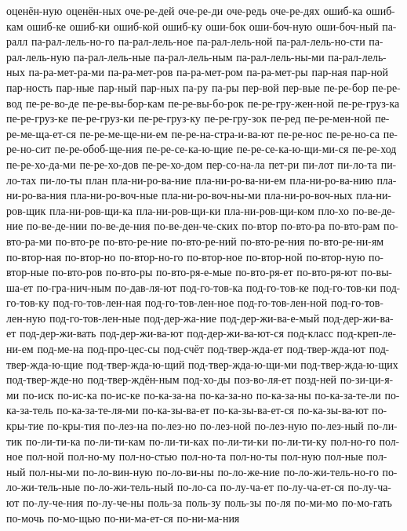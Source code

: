 {оценён-ную
оценён-ных
оче-ре-дей
оче-ре-ди
оче-редь
оче-ре-дях
ошиб-ка
ошиб-кам
ошиб-ке
ошиб-ки
ошиб-кой
ошиб-ку
оши-бок
оши-боч-ную
оши-боч-ный
па-ралл
па-рал-лель-но-го
па-рал-лель-ное
па-рал-лель-ной
па-рал-лель-но-сти
па-рал-лель-ную
па-рал-лель-ные
па-рал-лель-ным
па-рал-лель-ны-ми
па-рал-лель-ных
па-ра-мет-ра-ми
па-ра-мет-ров
па-ра-мет-ром
па-ра-мет-ры
пар-ная
пар-ной
пар-ность
пар-ные
пар-ный
пар-ных
па-ру
па-ры
пер-вой
пер-вые
пе-ре-бор
пе-ре-вод
пе-ре-во-де
пе-ре-вы-бор-кам
пе-ре-вы-бо-рок
пе-ре-гру-жен-ной
пе-ре-груз-ка
пе-ре-груз-ке
пе-ре-груз-ки
пе-ре-груз-ку
пе-ре-гру-зок
пе-ред
пе-ре-мен-ной
пе-ре-ме-ща-ет-ся
пе-ре-ме-ще-ни-ем
пе-ре-на-стра-и-ва-ют
пе-ре-нос
пе-ре-но-са
пе-ре-но-сит
пе-ре-обоб-ще-ния
пе-ре-се-ка-ю-щие
пе-ре-се-ка-ю-щи-ми-ся
пе-ре-ход
пе-ре-хо-да-ми
пе-ре-хо-дов
пе-ре-хо-дом
пер-со-на-ла
пет-ри
пи-лот
пи-ло-та
пи-ло-тах
пи-ло-ты
план
пла-ни-ро-ва-ние
пла-ни-ро-ва-ни-ем
пла-ни-ро-ва-нию
пла-ни-ро-ва-ния
пла-ни-ро-воч-ные
пла-ни-ро-воч-ны-ми
пла-ни-ро-воч-ных
пла-ни-ров-щик
пла-ни-ров-щи-ка
пла-ни-ров-щи-ки
пла-ни-ров-щи-ком
пло-хо
по-ве-де-ние
по-ве-де-нии
по-ве-де-ния
по-ве-ден-че-ских
по-втор
по-вто-ра
по-вто-рам
по-вто-ра-ми
по-вто-ре
по-вто-ре-ние
по-вто-ре-ний
по-вто-ре-ния
по-вто-ре-ни-ям
по-втор-ная
по-втор-но
по-втор-но-го
по-втор-ное
по-втор-ной
по-втор-ную
по-втор-ные
по-вто-ров
по-вто-ры
по-вто-ря-е-мые
по-вто-ря-ет
по-вто-ря-ют
по-вы-ша-ет
по-гра-нич-ным
по-дав-ля-ют
под-го-тов-ка
под-го-тов-ке
под-го-тов-ки
под-го-тов-ку
под-го-тов-лен-ная
под-го-тов-лен-ное
под-го-тов-лен-ной
под-го-тов-лен-ную
под-го-тов-лен-ные
под-дер-жа-ние
под-дер-жи-ва-е-мый
под-дер-жи-ва-ет
под-дер-жи-вать
под-дер-жи-ва-ют
под-дер-жи-ва-ют-ся
под-класс
под-креп-ле-ни-ем
под-ме-на
под-про-цес-сы
под-счёт
под-твер-жда-ет
под-твер-жда-ют
под-твер-жда-ю-щие
под-твер-жда-ю-щий
под-твер-жда-ю-щи-ми
под-твер-жда-ю-щих
под-твер-жде-но
под-твер-ждён-ным
под-хо-ды
поз-во-ля-ет
позд-ней
по-зи-ци-я-ми
по-иск
по-ис-ка
по-ис-ке
по-ка-за-на
по-ка-за-но
по-ка-за-ны
по-ка-за-те-ли
по-ка-за-тель
по-ка-за-те-ля-ми
по-ка-зы-ва-ет
по-ка-зы-ва-ет-ся
по-ка-зы-ва-ют
по-кры-тие
по-кры-тия
по-лез-на
по-лез-но
по-лез-ной
по-лез-ную
по-лез-ный
по-ли-тик
по-ли-ти-ка
по-ли-ти-кам
по-ли-ти-ках
по-ли-ти-ки
по-ли-ти-ку
пол-но-го
пол-ное
пол-ной
пол-но-му
пол-но-стью
пол-но-та
пол-но-ты
пол-ную
пол-ные
пол-ный
пол-ны-ми
по-ло-вин-ную
по-ло-ви-ны
по-ло-же-ние
по-ло-жи-тель-но-го
по-ло-жи-тель-ные
по-ло-жи-тель-ный
по-ло-са
по-лу-ча-ет
по-лу-ча-ет-ся
по-лу-ча-ют
по-лу-че-ния
по-лу-че-ны
поль-за
поль-зу
поль-зы
по-ля
по-ми-мо
по-мо-гать
по-мочь
по-мо-щью
по-ни-ма-ет-ся
по-ни-ма-ния
}
